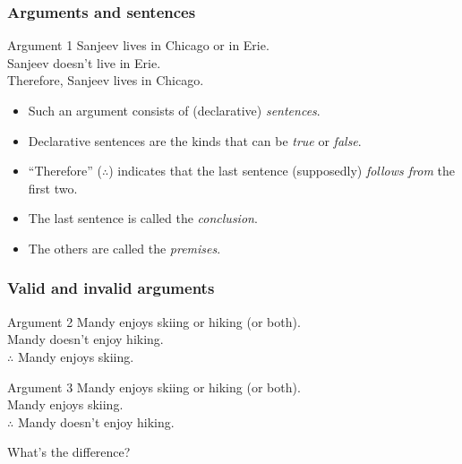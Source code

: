 \begin{frame}
  \frametitle{Arguments and sentences}

  \begin{block}{Argument 1}
  Sanjeev lives in Chicago or in Erie.\\
  Sanjeev doesn't live in Erie.\\
  Therefore, Sanjeev lives in Chicago.
  \end{block}

  \begin{itemize}[<+->]
  \item Such an argument consists of (declarative) \emph{sentences}.
  \item Declarative sentences are the kinds that can be \emph{true} or \emph{false}.
  \item ``Therefore'' ($\therefore$) indicates that the last sentence (supposedly)
  \emph{follows from} the first two.
  \item The last sentence is called the \emph{conclusion}.
  \item The others are called the \emph{premises}.
  \end{itemize}

\end{frame}


\begin{frame}
  \frametitle{Valid and invalid arguments}

  \begin{block}{Argument 2}
  Mandy enjoys skiing or hiking (or both).\\
  Mandy doesn't enjoy hiking.\\
  $\therefore$ Mandy enjoys skiing.
  \end{block}

  \begin{block}{Argument 3}
  Mandy enjoys skiing or hiking (or both).\\
  Mandy enjoys skiing.\\
  $\therefore$ Mandy doesn't enjoy hiking.
  \end{block}

  What's the difference?

\end{frame}



